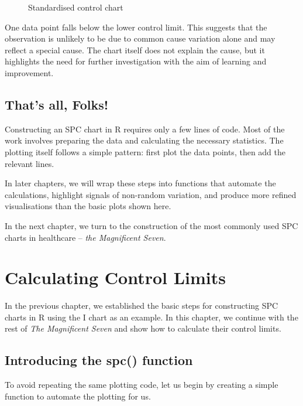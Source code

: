 \documentclass[
]{book}
\makeatletter
\newcommand*\pandocbounded[1]{%
  \sbox\pandoc@box{#1}%
  \Gscale@div\@tempa{\textheight}{\dimexpr\ht\pandoc@box+\dp\pandoc@box\relax}%
  \Gscale@div\@tempb{\linewidth}{\wd\pandoc@box}%
  \ifdim\@tempb\p@<\@tempa\p@\let\@tempa\@tempb\fi%
  \ifdim\@tempa\p@<\p@\scalebox{\@tempa}{\usebox\pandoc@box}%
  \else\usebox{\pandoc@box}%
  \fi%
}
\makeatother
\begin{document}
\begin{figure}
\centering
\pandocbounded{}
\caption{Standardised control chart}
\end{figure}

One data point falls below the lower control limit. This suggests that
the observation is unlikely to be due to common cause variation alone
and may reflect a special cause. The chart itself does not explain the
cause, but it highlights the need for further investigation with the aim
of learning and improvement.

\section{That's all, Folks!}\label{thats-all-folks}

Constructing an SPC chart in R requires only a few lines of code. Most
of the work involves preparing the data and calculating the necessary
statistics. The plotting itself follows a simple pattern: first plot the
data points, then add the relevant lines.

In later chapters, we will wrap these steps into functions that automate
the calculations, highlight signals of non-random variation, and produce
more refined visualisations than the basic plots shown here.

In the next chapter, we turn to the construction of the most commonly
used SPC charts in healthcare -- \emph{the Magnificent Seven}.

\chapter{Calculating Control Limits}\label{limits}

In the previous chapter, we established the basic steps for constructing
SPC charts in R using the I chart as an example. In this chapter, we
continue with the rest of \emph{The Magnificent Seven} and show how to
calculate their control limits.

\section{Introducing the spc()
function}\label{introducing-the-spc-function}

To avoid repeating the same plotting code, let us begin by creating a
simple function to automate the plotting for us.
\end{document}
